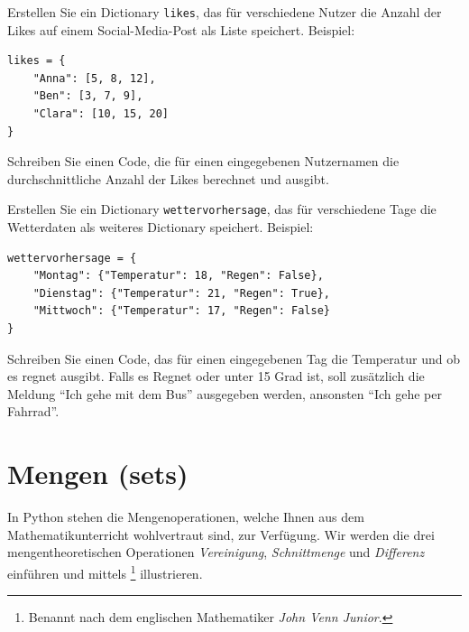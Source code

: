 \begin{myexercise}
	Erstellen Sie ein Dictionary \lstinline|likes|, das für verschiedene Nutzer die Anzahl der Likes auf einem Social-Media-Post als Liste speichert. Beispiel:
	\begin{lstlisting}
likes = {
	"Anna": [5, 8, 12],
	"Ben": [3, 7, 9],
	"Clara": [10, 15, 20]
}
\end{lstlisting}
	Schreiben Sie einen Code, die für einen eingegebenen Nutzernamen die durchschnittliche Anzahl der Likes berechnet und ausgibt.
	\begin{myanswer}
		
	\end{myanswer}
\end{myexercise}

\begin{myexercise}
	Erstellen Sie ein Dictionary \lstinline|wettervorhersage|, das für verschiedene Tage die Wetterdaten als weiteres Dictionary speichert. Beispiel:
	\begin{lstlisting}
wettervorhersage = {
	"Montag": {"Temperatur": 18, "Regen": False},
	"Dienstag": {"Temperatur": 21, "Regen": True},
	"Mittwoch": {"Temperatur": 17, "Regen": False}
}
\end{lstlisting}
	Schreiben Sie einen Code, das für einen eingegebenen Tag die Temperatur und ob es regnet ausgibt. Falls es Regnet oder unter 15 Grad ist, soll zusätzlich die Meldung \enquote{Ich gehe mit dem Bus} ausgegeben werden, ansonsten \enquote{Ich gehe per Fahrrad}.
	\begin{myanswer}
		
	\end{myanswer}
\end{myexercise}

\clearpage
\section{Mengen (sets)}
In Python stehen die Mengenoperationen, welche Ihnen aus dem Mathematikunterricht wohlvertraut sind, zur Verfügung. Wir werden die drei mengentheoretischen Operationen \textit{Vereinigung}, \textit{Schnittmenge} und \textit{Differenz} einführen und mittels \footnote{Benannt nach dem englischen Mathematiker \textit{John Venn Junior}.} illustrieren.

